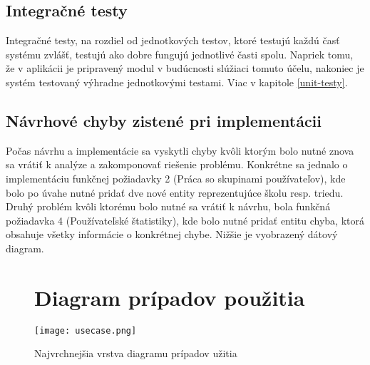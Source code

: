 \documentclass[12pt,oneside]{fithesis2}
\begin{document}
	 \subsection{Integračné testy}
	 \par Integračné testy, na rozdiel od jednotkových testov, ktoré testujú každú časť systému zvlášť, testujú ako dobre fungujú jednotlivé časti spolu\cite{sof5}. Napriek tomu, že v aplikácii je pripravený modul v budúcnosti slúžiaci tomuto účelu, nakoniec je systém testovaný výhradne jednotkovými testami. Viac v kapitole \ref{unit-testy}.
	 
	 \subsection{Návrhové chyby zistené pri implementácii}
	 \par Počas návrhu a implementácie sa vyskytli chyby kvôli ktorým bolo nutné znova sa vrátiť k analýze a zakomponovať riešenie problému. Konkrétne sa jednalo o implementáciu funkčnej požiadavky 2 (Práca so skupinami používateľov), kde bolo po úvahe nutné pridať dve nové entity reprezentujúce školu resp. triedu. Druhý problém kvôli ktorému bolo nutné sa vrátiť k návrhu, bola funkčná požiadavka 4 (Používateľské štatistiky), kde bolo nutné pridať entitu chyba, ktorá obsahuje všetky informácie o konkrétnej chybe. Nižšie je vyobrazený dátový diagram.
		
		\begin{figure}
	\section{Diagram prípadov použitia}
		\texttt{[image: usecase.png]}
	\caption{Najvrchnejšia vrstva diagramu prípadov užitia}
	\label{usecasediag}
	
	\end{figure}
	
\end{document}

